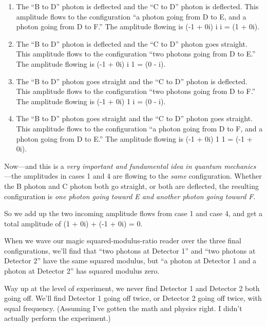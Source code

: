 \begin{enumerate}
\item The ``B to D'' photon is
deflected and the ``C to D'' photon
is deflected. This amplitude flows to the configuration
``a photon going from D to E, and a photon going from
D to F.'' The amplitude flowing is (-1 + 0i)
{\texttimes} i {\texttimes} i = (1 + 0i).

\item  The ``B to D'' photon is
deflected and the ``C to D'' photon
goes straight. This amplitude flows to the configuration
``two photons going from D to E.''
The amplitude flowing is (-1 + 0i) {\texttimes} i {\texttimes} 1 = (0 -
i).

\item The ``B to D'' photon goes
straight and the ``C to D'' photon
is deflected. This amplitude flows to the configuration
``two photons going from D to F.''
The amplitude flowing is (-1 + 0i) {\texttimes} 1 {\texttimes} i = (0 -
i).

\item  The ``B to D'' photon goes
straight and the ``C to D'' photon
goes straight. This amplitude flows to the configuration
``a photon going from D to F, and a photon going from
D to E.'' The amplitude flowing is (-1 + 0i)
{\texttimes} 1 {\texttimes} 1 = (-1 + 0i).
\end{enumerate}

{
 Now---and this is a \textit{very important and fundamental idea in
quantum mechanics}{}---the amplitudes in cases 1 and 4 are flowing to
the \textit{same} configuration. Whether the B photon and C photon both
go straight, or both are deflected, the resulting configuration is
\textit{one photon going toward E and another photon going toward F}.}

{
 So we add up the two incoming amplitude flows from case 1 and case
4, and get a total amplitude of (1 + 0i) + (-1 + 0i) = 0.}

{
 When we wave our magic squared-modulus-ratio reader over the three
final configurations, we'll find that
``two photons at Detector 1'' and
``two photons at Detector 2'' have
the same squared modulus, but ``a photon at Detector 1
and a photon at Detector 2'' has squared modulus
zero.}

{
 Way up at the level of experiment, we never find Detector 1 and
Detector 2 both going off. We'll find Detector 1 going
off twice, or Detector 2 going off twice, with equal frequency.
(Assuming I've gotten the math and physics right. I
didn't actually perform the experiment.)}

